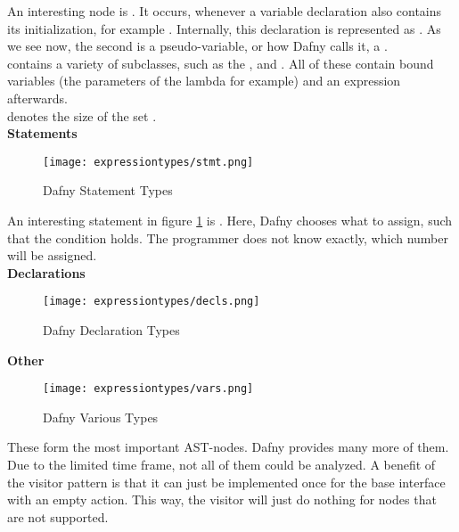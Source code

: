 An interesting node is .
It occurs, whenever a variable declaration also contains its initialization, for example .
Internally, this declaration is represented as \linebreak {}.
As we see now, the second  is a pseudo-variable, or how Dafny calls it, a .\\

 contains a variety of subclasses, such as the , \linebreak {} and .
All of these contain bound variables (the parameters of the lambda for example) and an expression afterwards.\\

 denotes the size of the set .\\

\pagebreak
\textbf{Statements}\\
\begin{figure}[H]
    \centering
    \texttt{[image: expressiontypes/stmt.png]}
    \caption{Dafny Statement Types}
    \label{fig:dafny_stmt}
\end{figure}

An interesting statement in figure \ref{fig:dafny_stmt} is .
Here, Dafny chooses what to assign, such that the condition holds.
The programmer does not know exactly, which number will be assigned.\\

\textbf{Declarations}\\
\begin{figure}[H]
    \centering
    \texttt{[image: expressiontypes/decls.png]}
    \caption{Dafny Declaration Types}
    \label{fig:dafny_decl}
\end{figure}

\pagebreak
\textbf{Other}
\begin{figure}[H]
    \centering
    \texttt{[image: expressiontypes/vars.png]}
    \caption{Dafny Various Types}
    \label{fig:dafny_vars}
\end{figure}

These form the most important AST-nodes.
Dafny provides many more of them.
Due to the limited time frame, not all of them could be analyzed.
A benefit of the visitor pattern is that it can just be implemented once for the base interface  with an empty action.
This way, the visitor will just do nothing for nodes that are not supported.

